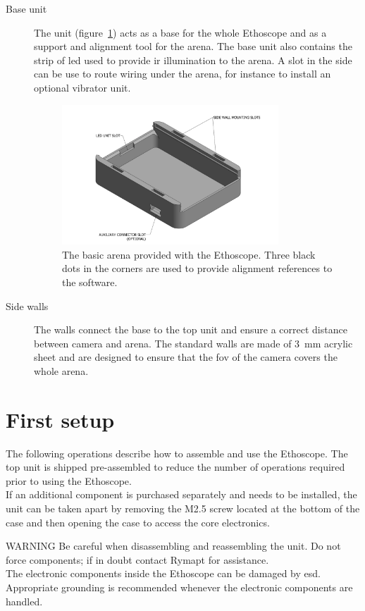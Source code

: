 \begin{description}
  \item[Base unit] The unit (figure~\ref{fig:base_unit}) acts as a base for the whole Ethoscope and as a support and alignment tool for the arena. The base unit also contains the strip of \gls{led} used to provide \gls{ir} illumination to the arena. A slot in the side can be use to route wiring under the arena, for instance to install an optional vibrator unit.
    \begin{figure}
      \centering
      \includegraphics[width=0.8\textwidth]{./images/view_base.pdf}
      \caption{The basic arena provided with the Ethoscope. Three black dots in the corners are used to provide alignment references to the software.}
      \label{fig:base_unit}
    \end{figure}
      
  \item[Side walls] The walls connect the base to the top unit and ensure a correct distance between camera and arena. The standard walls are made of 3~mm acrylic sheet and are designed to ensure that the \gls{fov} of the camera covers the whole arena. 
\end{description}

\section{First setup}\label{ch:setup}
The following operations describe how to assemble and use the Ethoscope.
The top unit is shipped pre-assembled to reduce the number of operations required prior to using the Ethoscope.\\
If an additional component is purchased separately and needs to be installed, the unit can be taken apart by removing the M2.5 screw located at the bottom of the case and then opening the case to access the core electronics.
\begin{alertinfo}{WARNING}
        Be careful when disassembling and reassembling the unit. Do not force components; if in doubt contact Rymapt for assistance.\\
        The electronic components inside the Ethoscope can be damaged by \gls{esd}.\\
        Appropriate grounding is recommended whenever the electronic components are handled.
\end{alertinfo}\\
